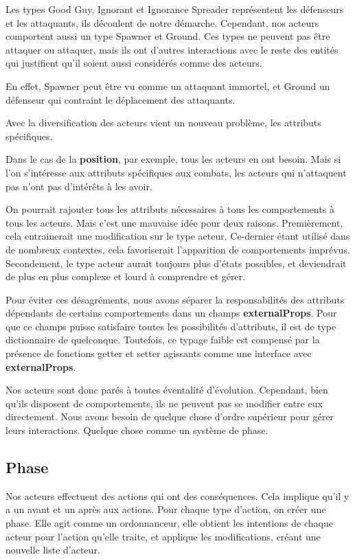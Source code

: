 \documentclass{article}
\begin{document}
Les types Good Guy, Ignorant et Ignorance Spreader représentent 
les défenseurs et les attaquants, ils découlent de notre démarche.
Cependant, nos acteurs comportent aussi un type Spawner et Ground.
Ces types ne peuvent pas être attaquer ou attaquer, mais ils ont 
d'autres interactions avec le reste des entités qui justifient qu'il 
soient aussi considérés comme des acteurs.

En effet, Spawner peut être vu comme un attaquant immortel, et Ground 
un défenseur qui contraint le déplacement des attaquants.

Avec la diversification des acteurs vient un nouveau problème,
les attributs spécifiques.

Dans le cas de la \textbf{position}, par exemple, tous les acteurs en ont besoin.
Mais si l'on s'intéresse aux attributs spécifiques aux combats, les acteurs 
qui n'attaquent pas n'ont pas d'intérêts à les avoir.

On pourrait rajouter tous les attributs nécessaires à tous les comportements 
à tous les acteurs. Mais c'est une mauvaise idée pour deux raisons.
Premièrement, cela entrainerait une modification sur le type acteur.
Ce-dernier étant utilisé dans de nombreux contextes, cela favoriserait 
l'apparition de comportements imprévus.
Secondement, le type acteur aurait toujours plus d'états possibles, 
et deviendrait de plus en plus complexe et lourd à comprendre et gérer.

Pour éviter ces désagréments, nous avons séparer la responsabilités des attributs 
dépendants de certains comportements dans un champs \textbf{externalProps}.
Pour que ce champs puisse satisfaire toutes les possibilités d'attributs, il
est de type dictionnaire de quelconque. Toutefois, ce typage faible est compensé 
par la présence de fonctions getter et setter agissants comme une interface 
avec \textbf{externalProps}.

Nos acteurs sont donc parés à toutes éventalité d'évolution.
Cependant, bien qu'ils disposent de comportements, ils ne peuvent pas se modifier 
entre eux directement.
Nous avons besoin de quelque chose d'ordre supérieur pour gérer leurs interactions.
Quelque chose comme un système de phase.

\subsection{Phase}

Nos acteurs effectuent des actions qui ont des conséquences.
Cela implique qu'il y a un avant et un après aux actions.
Pour chaque type d'action, on créer une phase.
Elle agit comme un ordonnanceur, elle obtient les intentions de chaque 
acteur pour l'action qu'elle traite, et applique les modifications, 
créant une nouvelle liste d'acteur.
\end{document}
